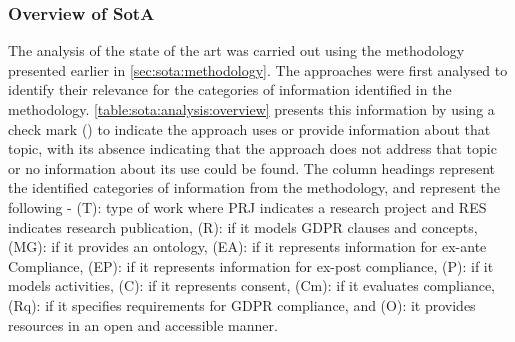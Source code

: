 \subsubsection{Overview of SotA}
The analysis of the state of the art was carried out using the methodology presented earlier in \autoref{sec:sota:methodology}.
The approaches were first analysed to identify their relevance for the categories of information identified in the methodology.
\autoref{table:sota:analysis:overview} presents this information by using a check mark (\cmark) to indicate the approach uses or provide information about that topic, with its absence indicating that the approach does not address that topic or no information about its use could be found.
The column headings represent the identified categories of information from the methodology, and represent the following - (T): type of work where PRJ indicates a research project and RES indicates research publication, (R): if it models GDPR clauses and concepts, (MG): if it provides an ontology, (EA): if it represents information for ex-ante Compliance, (EP): if it represents information for ex-post compliance, (P): if it models activities, (C): if it represents consent, (Cm): if it evaluates compliance, (Rq): if it specifies requirements for GDPR compliance, and (O): it provides resources in an open and accessible manner.
